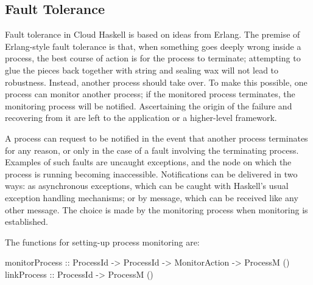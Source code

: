 \documentclass{sigplanconf}
\begin{document}


\subsection{Fault Tolerance}
\label{FaultTolerance}
Fault tolerance in Cloud Haskell is based on ideas from Erlang. 
%
The premise of Erlang-style fault tolerance is that, when something goes deeply wrong inside a process, the best course of action is for the process to terminate; attempting to glue the pieces back together with string and sealing wax will not lead to robustness.   Instead, another process should take over.  
To make this possible, one process can monitor another process; if the monitored process terminates, the monitoring process will be notified. 
Ascertaining the origin of the failure and recovering from it are left to the application or a higher-level framework.

A process can request to be notified in the event that another process terminates for any reason, or only in the case of a fault involving the terminating process.
Examples of such faults are uncaught exceptions, and the node on which the process is running becoming inaccessible. 
Notifications can be delivered in two ways: as asynchronous exceptions, which can be caught with Haskell's usual exception handling mechanisms; or by message, which can be received like any other message.
The choice is made by the monitoring process when monitoring is established.

The functions for setting-up process monitoring are:

\begin{code}
monitorProcess :: ProcessId -> ProcessId
               		-> MonitorAction -> ProcessM ()
linkProcess    :: ProcessId -> ProcessM ()
\end{code}
\end{document}
